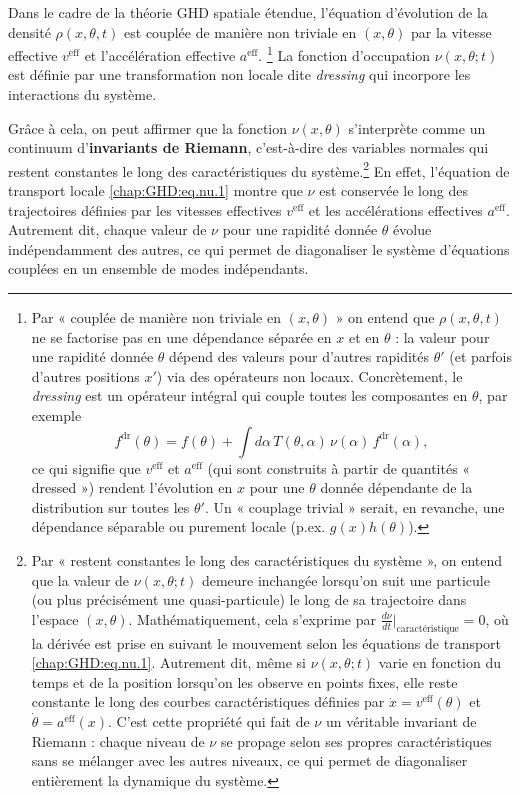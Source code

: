 \medskip

Dans le cadre de la théorie \gls{GHD} spatiale étendue, l'équation d'évolution de la densité \(\rho(x,\theta,t)\) est couplée de manière non triviale en \((x,\theta)\) par la vitesse effective \(v^{\mathrm{eff}}\) et l'accélération effective \(a^{\mathrm{eff}}\). \footnote{Par « couplée de manière non triviale en $(x,\theta)$ » on entend que $\rho(x,\theta,t)$ ne se factorise pas en une dépendance séparée en $x$ et en $\theta$ : la valeur pour une rapidité donnée $\theta$ dépend des valeurs pour d'autres rapidités $\theta'$ (et parfois d'autres positions $x'$) via des opérateurs non locaux. Concrètement, le \emph{dressing} est un opérateur intégral qui couple toutes les composantes en $\theta$, par exemple
$$f^{\mathrm{dr}}(\theta)=f(\theta)+\int d\alpha\,T(\theta,\alpha)\,\nu(\alpha)\,f^{\mathrm{dr}}(\alpha),$$
ce qui signifie que $v^{\mathrm{eff}}$ et $a^{\mathrm{eff}}$ (qui sont construits à partir de quantités « dressed ») rendent l'évolution en $x$ pour une $\theta$ donnée dépendante de la distribution sur toutes les $\theta'$. Un « couplage trivial » serait, en revanche, une dépendance séparable ou purement locale (p.ex. $g(x)h(\theta)$).} 
La fonction d'occupation \(\nu(x,\theta ; t)\) est définie par une transformation non locale dite \emph{dressing} qui incorpore les interactions du système.




\medskip

Grâce à cela, on peut affirmer que la fonction $\nu (x , \theta)$  s’interprète comme un continuum d’{\bf invariants de Riemann}, c’est-à-dire des variables normales qui restent constantes le long des caractéristiques du système.\footnote{Par « restent constantes le long des caractéristiques du système », on entend que la valeur de $\nu(x,\theta;t)$ demeure inchangée lorsqu'on suit une particule (ou plus précisément une quasi-particule) le long de sa trajectoire dans l'espace $(x,\theta)$. Mathématiquement, cela s'exprime par $\frac{d\nu}{dt}\big|_{\text{caractéristique}} = 0$, où la dérivée est prise en suivant le mouvement selon les équations de transport \eqref{chap:GHD:eq.nu.1}. Autrement dit, même si $\nu(x,\theta;t)$ varie en fonction du temps et de la position lorsqu'on les observe en points fixes, elle reste constante le long des courbes caractéristiques définies par $\dot{x} = v^{\mathrm{eff}}(\theta)$ et $\dot{\theta} = a^{\mathrm{eff}}(x)$. C'est cette propriété qui fait de $\nu$ un véritable invariant de Riemann : chaque niveau de $\nu$ se propage selon ses propres caractéristiques sans se mélanger avec les autres niveaux, ce qui permet de diagonaliser entièrement la dynamique du système.}
En effet, l'équation de transport locale \eqref{chap:GHD:eq.nu.1} montre que \(\nu\) est conservée le long des trajectoires définies par les vitesses effectives \(v^{\mathrm{eff}}\) et les accélérations effectives \(a^{\mathrm{eff}}\). Autrement dit, chaque valeur de \(\nu\) pour une rapidité donnée \(\theta\) évolue indépendamment des autres, ce qui permet de diagonaliser le système d'équations couplées en un ensemble de modes indépendants.


